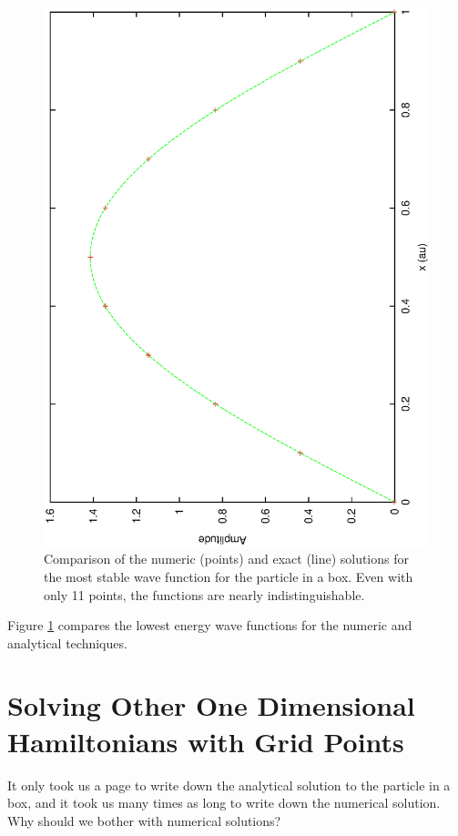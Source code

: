 \begin{figure}
\begin{center}
\includegraphics[scale=0.4,angle=270]{conf_el.eps}
\end{center}
\caption{Comparison of the numeric (points) and exact (line) solutions
for the most stable wave function for the particle in a box. Even with
only 11 points, the functions are nearly indistinguishable.}
\label{conf-el-fig}
\end{figure}

Figure \ref{conf-el-fig} compares the lowest energy wave functions for
the numeric and analytical techniques.

\section{Solving Other One Dimensional Hamiltonians with Grid Points}
It only took us a page to write down the analytical solution to the
particle in a box, and it took us many times as long to write down the
numerical solution. Why should we bother with numerical solutions?


